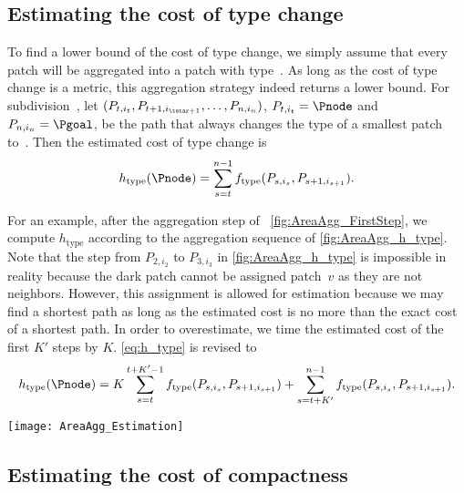 \subsection{Estimating the cost of type change}
\label{sec:AreaAgg_h_type}

To find a lower bound of the cost of type change, 
we simply assume that 
every patch will be aggregated into a patch with type~\Tgoal.
As long as the cost of type change is a metric, this aggregation 
strategy indeed returns a lower bound.
%
For subdivision~\Pnode, let
$(P_{t,i_t}, P_{t+1,i_{\tstar+1}}, \dots,P_{n,i_n})$, 
$P_{t,i_t}=\Pnode$ and $P_{n,i_n}=\Pgoal$,
be the path that always changes the type of a smallest patch 
to~\Tgoal.
Then the estimated cost of type change is
\begin{equation}
	\label{eq:h_type}
	h_\mathrm{type}(\Pnode)=
\sum_{s=t}^{n-1}f_\mathrm{type}(P_{s,i_s},P_{s+1,i_{s+1}}).
\end{equation}

For an example, after the aggregation step of 
~\ref{fig:AreaAgg_FirstStep}, we compute $h_\mathrm{type}$ 
according to the aggregation sequence of 
\fig\ref{fig:AreaAgg_h_type}.
Note that the step from $P_{2,i_2}$ to 
$P_{3,i_3}$ 
in 
\fig\ref{fig:AreaAgg_h_type} is impossible in reality 
because the dark patch cannot be assigned patch~$v$
as they are not neighbors. 
However, this assignment is allowed for estimation 
because we may find a shortest path as long as 
the estimated cost is no more than 
the exact cost of a shortest path.
In order to overestimate, we time the estimated cost of the 
first $K'$ steps by $K$.
\fo\ref{eq:h_type} is revised to
\begin{equation}
\label{eq:o_type}
h_\mathrm{type}(\Pnode)=
K\sum_{s=t}^{t+K'-1}f_\mathrm{type}(P_{s,i_s},P_{s+1,i_{s+1}})+
\sum_{s=t+K'}^{n-1}f_\mathrm{type}(P_{s,i_s},P_{s+1,i_{s+1}}).
\end{equation}


\begin{figure*}[tb]
	\centering
	\texttt{[image: AreaAgg\_Estimation]}
	\caption{An ``aggregation sequence'' for computing 
		$h_{\mathrm{type}}$, 
		based on the aggregation result of 
		\fig\ref{fig:AreaAgg_FirstStep}b}
	\label{fig:AreaAgg_h_type}
\end{figure*}








\subsection{Estimating the cost of compactness}
\label{sec:AreaAgg_h_comp}

